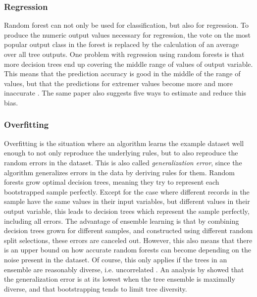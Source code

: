 \documentclass[a4paper,man,12pt,apacite,floatsintext,draftfirst]{apa6} %
\begin{document}
\subsubsection{Regression}
Random forest can not only be used for classification, but also for regression.
To produce the numeric output values necessary for regression,
the vote on the most popular output class in the forest is replaced by the
calculation of an average over all tree outputs.
One problem with regression using random forests is that more decision trees
end up covering the middle range of values of output variable.
This means that the prediction accuracy is good in the middle of the range
of values, but that the predictions for extremer values become more and more
inaccurate \cite{zhang2012bias}.
The same paper also suggests five ways to estimate and reduce this bias.

\subsubsection{Overfitting}
Overfitting \cite{wpOF} is the situation where an algorithm learns the
example dataset well enough to not only reproduce the underlying rules,
but to also reproduce the random errors in the dataset.
This is also called \emph{generalization error}, since the algorithm
generalizes errors in the data by deriving rules for them.
Random forests grow optimal decision trees, meaning they try to represent
each bootstrapped sample perfectly.
Except for the case where different records in the sample have the same
values in their input variables, but different values in their output variable,
this leads to decision trees which represent the sample perfectly,
including all errors.
The advantage of ensemble learning is that by combining decision trees grown
for different samples, and constructed using different random split selections,
these errors are canceled out.
However, this also means that there is an upper bound on how accurate
random forests can become depending on the noise present in the dataset.
Of course, this only applies if the trees in an ensemble are reasonably
diverse, i.e. uncorrelated \cite{breiman2001random}.
An analysis by \cite{liu2005maximizing} showed that the generalization error
is at its lowest when the tree ensemble is maximally diverse,
and that bootstrapping tends to limit tree diversity.
\end{document}
